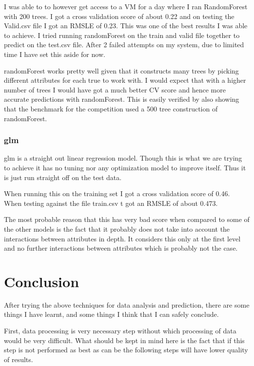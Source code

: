 \documentclass[paper=a4, fontsize=11pt]{scrartcl}	%
\numberwithin{equation}{section}		%
\numberwithin{figure}{section}			%
\numberwithin{table}{section}				%
\begin{document}
I was able to to however get access to a VM for a day where I ran RandomForest with 200 trees. I got a cross validation score of about 0.22 and on testing the Valid.csv file I got an RMSLE of 0.23. This was one of the best results I was able to achieve. I tried running randomForest on the train and valid file together to predict on the test.csv file. After 2 failed attempts on my system, due to limited time I have set this aside for now.

randomForest works pretty well given that it constructs many trees by picking different attributes for each true to work with. I would expect that with a higher number of trees I would have got a much better CV score and hence more accurate predictions with randomForest. This is easily verified by also showing that the benchmark for the competition used a 500 tree construction of randomForest.

\subsubsection{glm}

glm is a straight out linear regression model. Though this is what we are trying to achieve it has no tuning nor any optimization model to improve itself. Thus it is just run straight off on the test data. 

When running this on the training set I got a cross validation score of 0.46. When testing against the file train.csv t got an RMSLE of about 0.473.

The most probable reason that this has very bad score when compared to some of the other models is the fact that it probably does not take into account the interactions between attributes in depth. It considers this only at the first level and no further interactions between attributes which is probably not the case.

\section{Conclusion}

After trying the above techniques for data analysis and prediction, there are some things I have learnt, and some things I think that I can safely conclude.

First, data processing is very necessary step without which processing of data would be very difficult. What should be kept in mind here is the fact that if this step is not performed as best as can be the following steps will have lower quality of results.
\end{document}
